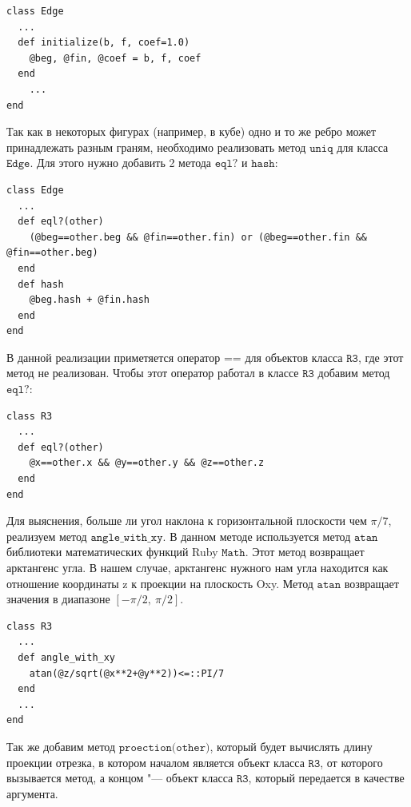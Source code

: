 \begin{small}
\begin{verbatim}
class Edge 
  ...
  def initialize(b, f, coef=1.0)
    @beg, @fin, @coef = b, f, coef
  end  
    ...
end
\end{verbatim}
\end{small}

Так как в некоторых фигурах (например, в кубе) одно и то же ребро может принадлежать разным граням, необходимо реализовать метод $\texttt{uniq}$ для класса $\texttt{Edge}$. Для этого нужно добавить 2 метода $\texttt{eql?}$ и $\texttt{hash}$:

\begin{small}
\begin{verbatim}
class Edge 
  ...
  def eql?(other)
    (@beg==other.beg && @fin==other.fin) or (@beg==other.fin && @fin==other.beg) 
  end
  def hash
    @beg.hash + @fin.hash
  end
end
\end{verbatim}
\end{small}

В данной реализации приметяется оператор $\texttt{==}$ для объектов класса $\texttt{R3}$, где этот метод не реализован. Чтобы этот оператор работал в классе $\texttt{R3}$ добавим метод  $\texttt{eql?}$:

\begin{small}
\begin{verbatim}
class R3
  ...
  def eql?(other)
    @x==other.x && @y==other.y && @z==other.z
  end
end
\end{verbatim}
\end{small}

Для выяснения, больше ли угол наклона к горизонтальной плоскости чем $\pi/7$, реализуем метод $\texttt{angle\_with\_xy}$. В данном методе используется метод $\texttt{atan}$ библиотеки математических функций Ruby $\texttt{Math}$. Этот метод возвращает арктангенс угла. В нашем случае, арктангенс нужного нам угла находится как отношение координаты z к проекции на плоскость Oxy. Метод $\texttt{atan}$ возвращает значения в диапазоне $\left [ -\pi/2,~\pi/2 \right ]$.

\begin{small}
\begin{verbatim}
class R3
  ...
  def angle_with_xy
    atan(@z/sqrt(@x**2+@y**2))<=::PI/7
  end
  ...
end
\end{verbatim}
\end{small}

Так же добавим метод $\texttt{proection(other)}$, который будет вычислять длину проекции отрезка, в котором началом является объект класса $\texttt{R3}$, от которого вызывается метод, а концом "--- объект класса $\texttt{R3}$, который передается в качестве аргумента.

